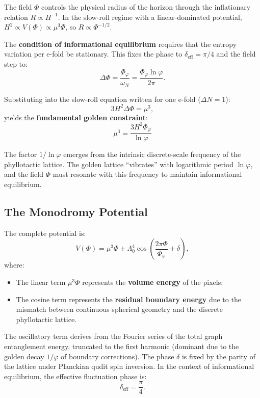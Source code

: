 \documentclass[11pt,a4paper]{article}
\theoremstyle{definition}
\begin{document}
The field $\Phi$ controls the physical radius of the horizon through the inflationary relation $R \propto H^{-1}$. In the slow-roll regime with a linear-dominated potential, $H^2 \propto V(\Phi) \propto \mu^3\Phi$, so $R \propto \Phi^{-1/2}$.

The \textbf{condition of informational equilibrium} requires that the entropy variation per e-fold be stationary. This fixes the phase to $\delta_{\text{eff}} = \pi/4$ and the field step to:
\begin{equation}
\Delta\Phi = \frac{\Phi_\varphi}{\omega_N} = \frac{\Phi_\varphi \ln\varphi}{2\pi}.
\end{equation}

Substituting into the slow-roll equation written for one e-fold ($\Delta N = 1$):
\begin{equation}
3H^2 \Delta\Phi = \mu^3,
\end{equation}
yields the \textbf{fundamental golden constraint}:
\begin{equation}\label{eq:golden_constraint}
\boxed{\mu^3 = \frac{3H^2 \Phi_\varphi}{\ln\varphi}}
\end{equation}

The factor $1/\ln\varphi$ emerges from the intrinsic discrete-scale frequency of the phyllotactic lattice. The golden lattice ``vibrates'' with logarithmic period $\ln\varphi$, and the field $\Phi$ must resonate with this frequency to maintain informational equilibrium.

\subsection{The Monodromy Potential}

The complete potential is:
\begin{equation}\label{eq:potential}
V(\Phi) = \mu^3\Phi + \Lambda_0^4 \cos\left(\frac{2\pi\Phi}{\Phi_\varphi} + \delta\right),
\end{equation}
where:
\begin{itemize}
    \item The linear term $\mu^3\Phi$ represents the \textbf{volume energy} of the pixels;
    \item The cosine term represents the \textbf{residual boundary energy} due to the mismatch between continuous spherical geometry and the discrete phyllotactic lattice.
\end{itemize}

The oscillatory term derives from the Fourier series of the total graph entanglement energy, truncated to the first harmonic (dominant due to the golden decay $1/\varphi$ of boundary corrections). The phase $\delta$ is fixed by the parity of the lattice under Planckian qudit spin inversion. In the context of informational equilibrium, the effective fluctuation phase is:
\begin{equation}
\delta_{\text{eff}} = \frac{\pi}{4}.
\end{equation}
\end{document}
